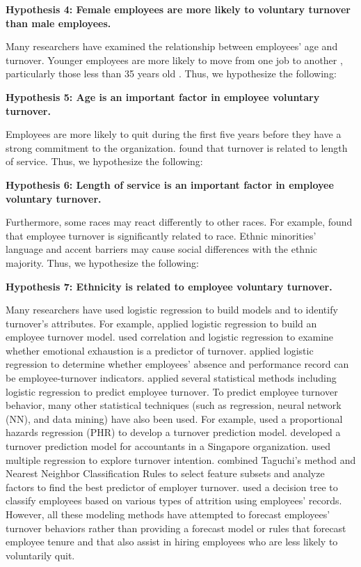 \textbf{Hypothesis 4: Female employees are more likely to voluntary turnover than male employees.}

Many researchers have examined the relationship between employees' age and turnover. Younger employees are more likely to move from one job to another \citep{burke1994}, particularly those less than 35 years old \citep{RN45}. Thus, we hypothesize the following:

\textbf{Hypothesis 5: Age is an important factor in employee voluntary turnover.}

Employees are more likely to quit during the first five years before they have a strong commitment to the organization. \citet{bluedorn1982} found that turnover is related to length of service. Thus, we hypothesize the following:

\textbf{Hypothesis 6: Length of service is an important factor in employee voluntary turnover.}

Furthermore, some races may react differently to other races. For example, \citet{RN42} found that employee turnover is significantly related to race. Ethnic minorities' language and accent barriers may cause social differences with the ethnic majority. Thus, we hypothesize the following:

\textbf{Hypothesis 7: Ethnicity is related to employee voluntary turnover.}

Many researchers have used logistic regression to build models and to identify turnover's attributes. For example, \citet{balfour1993} applied logistic regression to build an employee turnover model. \citet{wright1998} used correlation and logistic regression to examine whether emotional exhaustion is a predictor of turnover. \citet{morrow1999} applied logistic regression to determine whether employees' absence and performance record can be employee-turnover indicators. \citet{nagadevara2008} applied several statistical methods including logistic regression to predict employee turnover.
To predict employee turnover behavior, many other statistical techniques (such as regression, neural network (NN), and data mining) have also been used. For example, \citet{ng1991} used a proportional hazards regression (PHR) to develop a turnover prediction model. \citet{RN6} developed a turnover prediction model for accountants in a Singapore organization. \citet{RN8} used multiple regression to explore turnover intention. \citet{RN10} combined Taguchi's method and Nearest Neighbor Classification Rules to select feature subsets and analyze factors to find the best predictor of employer turnover. \citet{alao2013} used a decision tree to classify employees based on various types of attrition using employees' records. However, all these modeling methods have attempted to forecast employees' turnover behaviors rather than providing a forecast model or rules that forecast employee tenure and that also assist in hiring employees who are less likely to voluntarily quit. 


